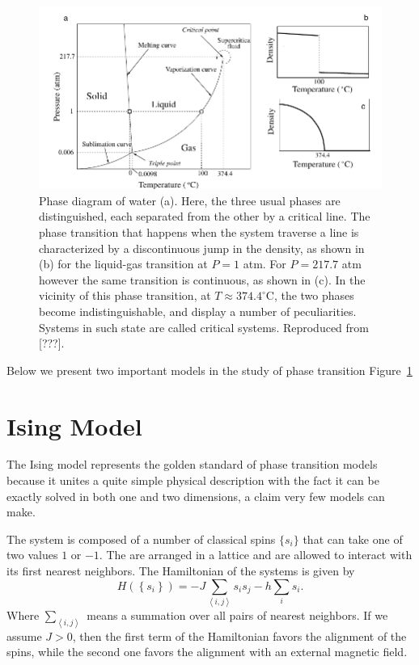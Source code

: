 \begin{figure}
\begin{center}
    \includegraphics[scale=1.0]{chapters/ch2-crit/figs/water}
\end{center}
\caption{Phase diagram of water (a). Here, the three usual phases are
    distinguished, each separated from the other by a critical line. The phase
    transition that happens when the system traverse a line is characterized by
    a discontinuous jump in the density, as shown in (b) for the liquid-gas
    transition at $P=1$ atm. For $P=217.7$ atm however the same transition is
    continuous, as shown in (c). In the vicinity of this phase transition, at
    $T\approx374.4^\circ$C, the two phases become indistinguishable, and
    display a number of peculiarities. Systems in such state are called
    critical systems. Reproduced from [???].}
\label{fig:water}
\end{figure}

Below we present two important models in the study of phase transition
Figure~\ref{fig:water} 


\section{Ising Model}
\label{sec:ising}

The Ising model represents the golden standard of phase transition models
because it unites a quite simple physical description with the fact it can be
exactly solved in both one and two dimensions, a claim very few models can
make.

The system is composed of a number of classical spins $\{s_i\}$ that can take
one of two values $1$ or $-1$. The are arranged in a lattice and are allowed to
interact with its first nearest neighbors. The Hamiltonian of the systems is
given by
\begin{equation}
    \label{eq:ising}
    H\left(\left\{s_{i}\right\}\right) = 
        -J\sum_{\left\langle i,j\right\rangle}s_{i}s_{j}
        -h\sum_{i}s_{i}.
\end{equation}
Where $\sum_{\left\langle i,j\right\rangle}$ means a summation over all pairs
of nearest neighbors. If we assume $J>0$, then the first term of the
Hamiltonian favors the alignment of the spins, while the second one 
favors the alignment with an external magnetic field.

